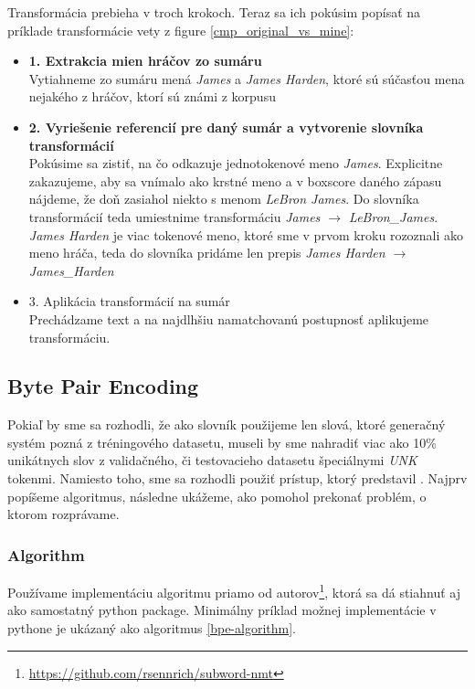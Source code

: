 Transformácia prebieha v troch krokoch. Teraz sa ich pokúsim popísať na príklade transformácie vety z figure \ref{cmp_original_vs_mine}:
\begin{itemize}
    \item \textbf{1. Extrakcia mien hráčov zo sumáru} \hfill \\
    Vytiahneme zo sumáru mená \emph{James} a \emph{James Harden}, ktoré sú súčasťou mena nejakého z hráčov, ktorí sú známi z korpusu
    \item \textbf{2. Vyriešenie referencií pre daný sumár a vytvorenie slovníka transformácií} \hfill \\
    Pokúsime sa zistiť, na čo odkazuje jednotokenové meno \emph{James}. Explicitne zakazujeme, aby sa vnímalo ako krstné meno a v boxscore daného zápasu nájdeme, že doň zasiahol niekto s menom \emph{LeBron James}. Do slovníka transformácií teda umiestnime transformáciu \emph{James $\rightarrow$ LeBron\_James}. \emph{James Harden} je viac tokenové meno, ktoré sme v prvom kroku rozoznali ako meno hráča, teda do slovníka pridáme len prepis \emph{James Harden $\rightarrow$ James\_Harden}
    \item 3. Aplikácia transformácií na sumár \hfill \\
    Prechádzame text a na najdlhšiu namatchovanú postupnosť aplikujeme transformáciu.
\end{itemize}

\subsection{Byte Pair Encoding} \label{bpeSection}

Pokiaľ by sme sa rozhodli, že ako slovník použijeme len slová, ktoré generačný systém pozná z tréningového datasetu, museli by sme nahradiť viac ako 10\% unikátnych slov z validačného, či testovacieho datasetu špeciálnymi \emph{UNK} tokenmi. Namiesto toho, sme sa rozhodli použiť prístup, ktorý predstavil \citep{sennrich2016}. Najprv popíšeme algoritmus, následne ukážeme, ako pomohol prekonať problém, o ktorom rozprávame.

\subsubsection{Algorithm}

Používame implementáciu algoritmu priamo od autorov\footnote{\url{https://github.com/rsennrich/subword-nmt}}, ktorá sa dá stiahnuť aj ako samostatný python package. Minimálny príklad možnej implementácie v pythone je ukázaný ako algoritmus \ref{bpe-algorithm}. 

